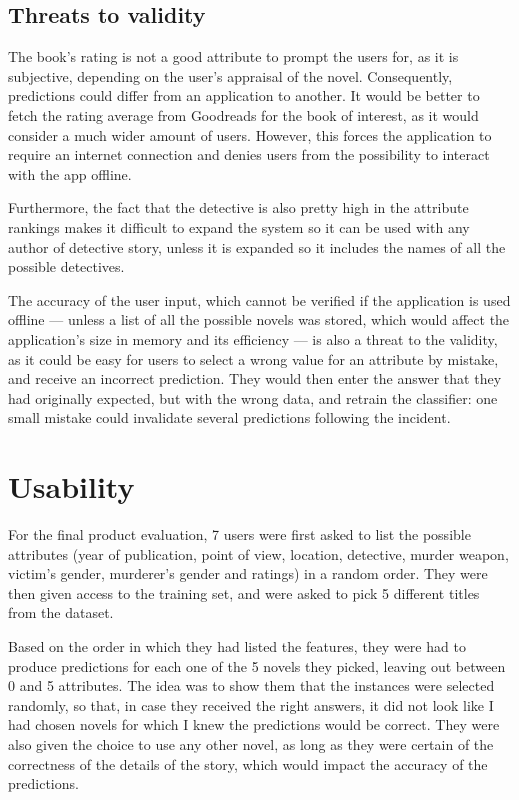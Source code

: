 \documentclass{mproj}
\begin{document}
\subsection*{Threats to validity}

The book's rating is not a good attribute to prompt the users for, as it is subjective, depending on the user's appraisal of the novel. Consequently, predictions could differ from an application to another. It would be better to fetch the rating average from Goodreads for the book of interest, as it would consider a much wider amount of users. However, this forces the application to require an internet connection and denies users from the possibility to interact with the app offline.

Furthermore, the fact that the detective is also pretty high in the attribute rankings makes it difficult to expand the system so it can be used with any author of detective story, unless it is expanded so it includes the names of all the possible detectives.

The accuracy of the user input, which cannot be verified if the application is used offline --- unless a list of all the possible novels was stored, which would affect the application's size in memory and its efficiency --- is also a threat to the validity, as it could be easy for users to select a wrong value for an attribute by mistake, and receive an incorrect prediction. They would then enter the answer that they had originally expected, but with the wrong data, and retrain the classifier: one small mistake could invalidate several predictions following the incident.


\section{Usability}

For the final product evaluation, 7 users were first asked to list the possible attributes (year of publication, point of view, location, detective, murder weapon, victim's gender, murderer's gender and ratings) in a random order. They were then given access to the training set, and were asked to pick 5 different titles from the dataset. \par

Based on the order in which they had listed the features, they were had to produce predictions for each one of the 5 novels they picked, leaving out between 0 and 5 attributes. The idea was to show them that the instances were selected randomly, so that, in case they received the right answers, it did not look like I had chosen novels for which I knew the predictions would be correct. They were also given the choice to use any other novel, as long as they were certain of the correctness of the details of the story, which would impact the accuracy of the predictions. \par 
\end{document}
